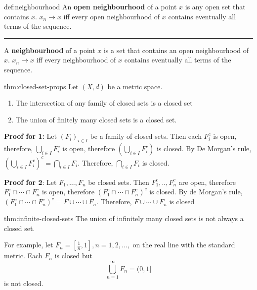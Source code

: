 \documentclass{article}
\begin{document}
\begin{dfn}{def:neighbourhood}{}
    An \textbf{open neighbourhood} of a point $x$ is any open set that contains $x$. $x_{n}\to x$ iff every open neighbourhood of $x$ contains eventually all terms of the sequence.

    \noindent\rule{\textwidth}{0.2pt}

    A \textbf{neighbourhood} of a point $x$ is a set that contains an open neighbourhood of $x$.  $x_{n}\to x$ iff every neighbourhood of $x$ contains eventually all terms of the sequence.
\end{dfn}

\begin{thm}{thm:closed-set-props}{}
    Let $(X, d)$ be a metric space.
    \begin{enumerate}
        \item The intersection of any family of closed sets is a closed set
        \item The union of finitely many closed sets is a closed set.
    \end{enumerate}
\end{thm}

\textbf{Proof for 1:} Let $(F_{i})_{i\in I}$ be a family of closed sets. Then each $F_{i}^{c}$ is open, therefore, $\displaystyle\bigcup_{i\in I} F^{c}_{i}$ is open, therefore $\displaystyle\left(\bigcup_{i\in I} F^{c}_{i}\right)$ is closed. By De Morgan's rule, $\displaystyle\left(\bigcup_{i\in I} F^{c}_{i}\right)^{c} = \bigcap_{i\in I} F_{i}$. Therefore, $\displaystyle\bigcap_{i\in I} F_{i}$ is closed.

\textbf{Proof for 2}: Let $F_{1},\dots, F_{n}$ be closed sets. Then $F^{c}_{1},..,F^{c}_{n}$ are open, therefore $F^{c}_{1} \cap \cdots \cap F^{c}_{n}$ is open, therefore $(F^{c}_{1} \cap \cdots \cap F^{c}_{n})^{c}$ is closed. By de Morgan's rule, $(F^{c}_{1}\cap \cdots\cap F^{c}_{n})^{c} = F \cup \cdots \cup F_{n}$. Therefore, $F \cup \cdots \cup F_{n}$ is closed

\begin{thm}{thm:infinite-closed-sets}{}
    The union of infinitely many closed sets is not always a closed set.

    For example, let $F_{n} = [\frac{1}{n}, 1], n=1,2,\dots,$ on the real line with the standard metric.
    Each $F_{n}$ is closed but
    \[\bigcup\limits_{n = 1}^{\infty}F_{n} = (0,1]\]
    is not closed.
\end{thm}
\end{document}
